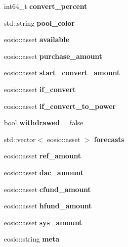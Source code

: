\begin{DoxyCompactItemize}
\item 
\mbox{\label{structbalance_ae340e646db87513680649541b7d67127}} 
int64\+\_\+t {\bfseries convert\+\_\+percent}
\item 
\mbox{\label{structbalance_a0044db0c6aa47669ec4a0be274cb5240}} 
std\+::string {\bfseries pool\+\_\+color}
\item 
\mbox{\label{structbalance_a2ebfdee4e226a44574200d72cef62b36}} 
eosio\+::asset {\bfseries available}
\item 
\mbox{\label{structbalance_abf8ce9c9100af8a509f46ea113d69b0a}} 
eosio\+::asset {\bfseries purchase\+\_\+amount}
\item 
\mbox{\label{structbalance_a59fe98e51b77617aefe83d7e41caa7b7}} 
eosio\+::asset {\bfseries start\+\_\+convert\+\_\+amount}
\item 
\mbox{\label{structbalance_a541a27b55aeabff4adcc9140b066205c}} 
eosio\+::asset {\bfseries if\+\_\+convert}
\item 
\mbox{\label{structbalance_a3cf5ede49ed606a3174a69d27367da00}} 
eosio\+::asset {\bfseries if\+\_\+convert\+\_\+to\+\_\+power}
\item 
\mbox{\label{structbalance_abe1f4b170794344c8096d5acbbcd7ef2}} 
bool {\bfseries withdrawed} = false
\item 
\mbox{\label{structbalance_a05925ffe786d40f4563c8ce1451d55e6}} 
std\+::vector$<$ eosio\+::asset $>$ {\bfseries forecasts}
\item 
\mbox{\label{structbalance_a2a13b04bd7da3263b966014b5cf46eda}} 
eosio\+::asset {\bfseries ref\+\_\+amount}
\item 
\mbox{\label{structbalance_ac3e370ea791c5b18846bc914f8cf599a}} 
eosio\+::asset {\bfseries dac\+\_\+amount}
\item 
\mbox{\label{structbalance_aa114410afa216d60a712fb677231ce0b}} 
eosio\+::asset {\bfseries cfund\+\_\+amount}
\item 
\mbox{\label{structbalance_ac149b98afd086a41b24b2deb1894b8ea}} 
eosio\+::asset {\bfseries hfund\+\_\+amount}
\item 
\mbox{\label{structbalance_a050e60d399f399ed44f19793778fd487}} 
eosio\+::asset {\bfseries sys\+\_\+amount}
\item 
\mbox{\label{structbalance_a70f30d92f79649b752878f9dcc61f7cf}} 
eosio\+::string {\bfseries meta}
\end{DoxyCompactItemize}


